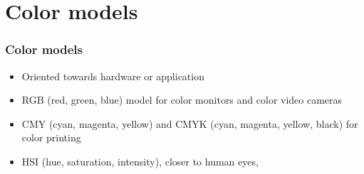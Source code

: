 \documentclass{beamer}
\begin{document}
\section{Color models}
\begin{frame}
\frametitle{Color models}
\begin{itemize}
	\item Oriented towards hardware or application
	\item RGB (red, green, blue) model for color monitors and color video cameras
	\item CMY (cyan, magenta, yellow) and CMYK (cyan, magenta, yellow, black) for color printing
	\item HSI (hue, saturation, intensity), closer to human eyes, 
\end{itemize}
\end{frame}
\end{document}
